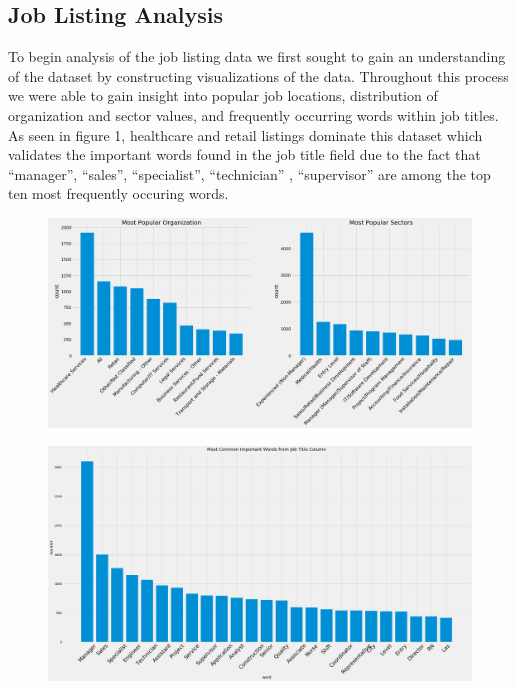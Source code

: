 \subsection{Job Listing Analysis}
To begin analysis of the job listing data we first sought to gain an understanding of the dataset by constructing visualizations of the data. Throughout this process we were able to gain insight into popular job locations, distribution of organization and sector values, and frequently occurring words within job titles.  As seen in figure 1, healthcare and retail listings dominate this dataset which validates the important words found in the job title field due to the fact that “manager”, “sales”, “specialist”, “technician” , “supervisor” are among the top ten most frequently occuring words. 
\begin{figure} 
	  \includegraphics[width=\textwidth]{images/listings_freq.png}
	\label{fig:test6}
\end{figure}
\begin{figure} 
	  \includegraphics[width=\textwidth]{images/listing_title.png}
	\label{fig:test5}
\end{figure}



